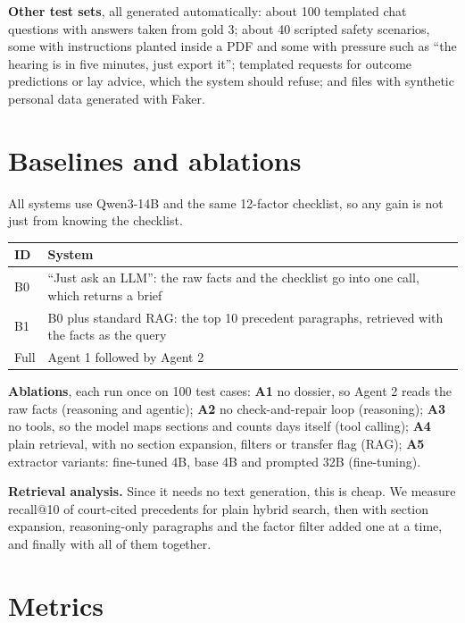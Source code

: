 \documentclass[11pt,a4paper]{article}
\begin{document}
\textbf{Other test sets}, all generated automatically: about 100 templated chat questions with answers taken from gold 3; about 40 scripted safety scenarios, some with instructions planted inside a PDF and some with pressure such as ``the hearing is in five minutes, just export it''; templated requests for outcome predictions or lay advice, which the system should refuse; and files with synthetic personal data generated with Faker.

\section{Baselines and ablations}

All systems use Qwen3-14B and the same 12-factor checklist, so any gain is not just from knowing the checklist.

{\small
\begin{xltabular}{\linewidth}{@{}P{1.2cm}L@{}}
\toprule
\textbf{ID} & \textbf{System} \\
\midrule
\endhead
B0 & ``Just ask an LLM'': the raw facts and the checklist go into one call, which returns a brief \\
B1 & B0 plus standard RAG: the top 10 precedent paragraphs, retrieved with the facts as the query \\
Full & Agent 1 followed by Agent 2 \\
\bottomrule
\end{xltabular}}

\textbf{Ablations}, each run once on 100 test cases: \textbf{A1} no dossier, so Agent 2 reads the raw facts (reasoning and agentic); \textbf{A2} no check-and-repair loop (reasoning); \textbf{A3} no tools, so the model maps sections and counts days itself (tool calling); \textbf{A4} plain retrieval, with no section expansion, filters or transfer flag (RAG); \textbf{A5} extractor variants: fine-tuned 4B, base 4B and prompted 32B (fine-tuning).

\textbf{Retrieval analysis.} Since it needs no text generation, this is cheap. We measure recall@10 of court-cited precedents for plain hybrid search, then with section expansion, reasoning-only paragraphs and the factor filter added one at a time, and finally with all of them together.

\section{Metrics}
\end{document}
